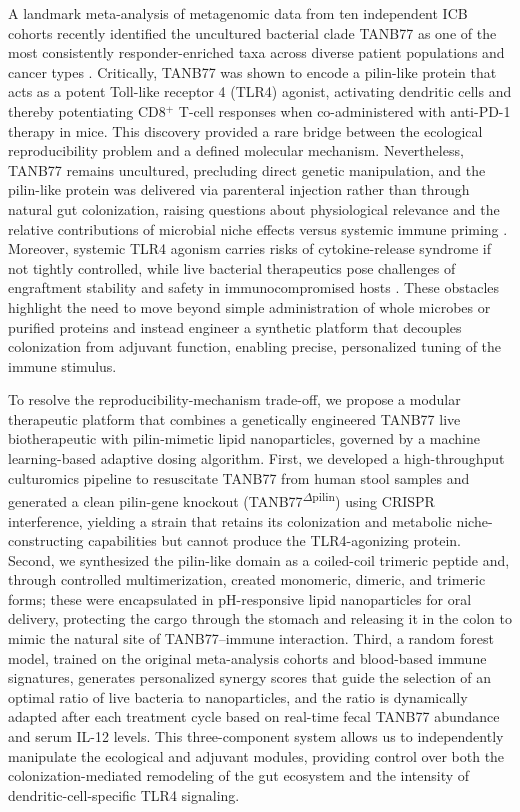 \documentclass{article}
\begin{document}
A landmark meta-analysis of metagenomic data from ten independent ICB cohorts recently identified the uncultured bacterial clade TANB77 as one of the most consistently responder-enriched taxa across diverse patient populations and cancer types \cite{Lee2023Cell}. Critically, TANB77 was shown to encode a pilin-like protein that acts as a potent Toll-like receptor 4 (TLR4) agonist, activating dendritic cells and thereby potentiating CD8$^+$ T-cell responses when co-administered with anti-PD-1 therapy in mice. This discovery provided a rare bridge between the ecological reproducibility problem and a defined molecular mechanism. Nevertheless, TANB77 remains uncultured, precluding direct genetic manipulation, and the pilin-like protein was delivered via parenteral injection rather than through natural gut colonization, raising questions about physiological relevance and the relative contributions of microbial niche effects versus systemic immune priming \cite{Lee2023Cell}. Moreover, systemic TLR4 agonism carries risks of cytokine-release syndrome if not tightly controlled, while live bacterial therapeutics pose challenges of engraftment stability and safety in immunocompromised hosts \cite{Thomas2019NatureComm, Zheng2020NatureReviewsImmunology}. These obstacles highlight the need to move beyond simple administration of whole microbes or purified proteins and instead engineer a synthetic platform that decouples colonization from adjuvant function, enabling precise, personalized tuning of the immune stimulus.

To resolve the reproducibility-mechanism trade-off, we propose a modular therapeutic platform that combines a genetically engineered TANB77 live biotherapeutic with pilin-mimetic lipid nanoparticles, governed by a machine learning-based adaptive dosing algorithm. First, we developed a high-throughput culturomics pipeline to resuscitate TANB77 from human stool samples and generated a clean pilin-gene knockout (TANB77\textsuperscript{$\Delta$pilin}) using CRISPR interference, yielding a strain that retains its colonization and metabolic niche-constructing capabilities but cannot produce the TLR4-agonizing protein. Second, we synthesized the pilin-like domain as a coiled-coil trimeric peptide and, through controlled multimerization, created monomeric, dimeric, and trimeric forms; these were encapsulated in pH-responsive lipid nanoparticles for oral delivery, protecting the cargo through the stomach and releasing it in the colon to mimic the natural site of TANB77–immune interaction. Third, a random forest model, trained on the original meta-analysis cohorts and blood-based immune signatures, generates personalized synergy scores that guide the selection of an optimal ratio of live bacteria to nanoparticles, and the ratio is dynamically adapted after each treatment cycle based on real-time fecal TANB77 abundance and serum IL-12 levels. This three-component system allows us to independently manipulate the ecological and adjuvant modules, providing control over both the colonization-mediated remodeling of the gut ecosystem and the intensity of dendritic-cell-specific TLR4 signaling.
\end{document}
